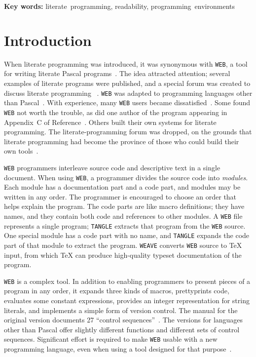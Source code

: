 \ifx\tr\undefined
\begin{center}\small
{\bf Key words:}
literate~programming, readability, programming~environments
\end{center}
\fi

\section{Introduction}
When literate programming was
introduced, it was synonymous with {\tt WEB}, a tool
for writing literate Pascal programs~\cite[Chapter~4]{knuth:literate:book}.
The idea attracted attention; several examples of literate
programs were published, and a special forum was created to discuss literate
programming~%
\cite{denning:announcing}. %
{\tt WEB} was  adapted to programming languages other than
Pascal~\cite{levy:cweb,ramsey:building,thimbleby:cweb}. %
%
With experience, many {\tt WEB} users became dissatisfied~\cite{ramsey:literate}.
Some found {\tt WEB} not worth the trouble, as did
one author of the program appearing in Appendix~C
of Reference~.
Others built their own systems for literate
 programming.  %
The literate-programming forum was dropped, on the grounds that
literate programming had become the province of those who could build
their own tools~\cite{cvw:assessment}.

{\tt WEB}  programmers
 interleave source code and descriptive text in a single document.
When using {\tt WEB}, a programmer divides the source code into
{\em modules}.
Each module has a documentation part and a code part, and
modules may be written in any order.
The programmer is encouraged to choose an order that helps explain the program.
The code parts are like macro definitions;  they have names, and they contain
both code and references to other modules.
A {\tt WEB} file represents a single program;
{\tt TANGLE}  extracts that program from the {\tt WEB} source.
One special module has a code part with no name, and {\tt TANGLE}
expands the code part of that module to extract the program.
{\tt WEAVE} converts {\tt WEB} source to
{\TeX} input, from which {\TeX} can produce high-quality typeset
documentation of the program.


{\tt WEB} is a complex tool.
In addition to enabling programmers to present pieces of a program in
any order, it expands three kinds of macros, prettyprints code,
evaluates some constant expressions,
provides an integer representation for string literals, and implements
a simple form of version control.
The manual for the original version documents 27 ``control sequences''~\cite{knuth:web}.
The versions for languages other than Pascal offer slightly different
functions and different sets of control sequences.
Significant effort is required to make {\tt WEB} usable with a new
programming language, even when using a tool designed for that
purpose~\cite{ramsey:building}.

